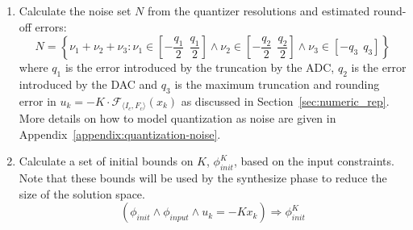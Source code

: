 \documentclass[runningheads,a4paper]{llncs}
\begin{document}
\begin{enumerate}
\begin{enumerate}
\item Calculate the noise set $N$ from the quantizer resolutions and estimated round-off errors: %
%
$$N=\left \{ \nu_1+\nu_2+ \nu_3 : \nu_1 \in \left[-\frac{q_1}{2}\ \ \frac{q_1}{2}\right] 
\wedge \nu_2 \in \left[-\frac{q_2}{2}\ \ \frac{q_2}{2}\right]  \wedge \nu_3 \in \left[-q_3\ \ q_3\right]  \right \}\nonumber$$
%
where  $q_1$ is the error introduced by the truncation by the ADC, $q_2$ is
the error introduced by the DAC and $q_3$ is the maximum truncation and
rounding error in $u_k=-K \cdot \mathcal{F}_{\langle I_c,F_c \rangle}(x_k)$ as
discussed in Section~\ref{sec:numeric_rep}.  More details on how to model
quantization as noise are given in
Appendix~\ref{appendix:quantization-noise}.

\item Calculate a set of initial bounds on $K$, $\phi_\mathit{init}^{K}$,
based on the input constraints.  Note that these bounds will be used by the
{\sc synthesize} phase to reduce the size of the solution space. 
%
$$(\phi_\mathit{init} \wedge \phi_\mathit{input} \wedge u_k=-K x_k)
\Rightarrow \phi_\mathit{init}^{K}$$


\end{enumerate}
\end{enumerate}
\end{document}

